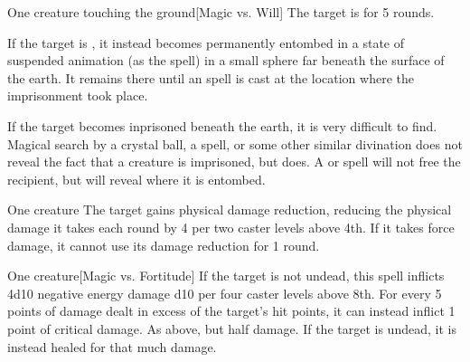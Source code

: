 \spellrng{\rngclose}
\begin{spelltarget}{One creature touching the ground}[Magic vs. Will]
    \spellsuccess The target is \slowed for 5 rounds.

    \spellsuccess If the target is \bloodied, it instead becomes permanently entombed in a state of suspended animation (as the  spell) in a small sphere far beneath the surface of the earth. It remains there until an  spell is cast at the location where the imprisonment took place.
\end{spelltarget}

\spellnotes If the target becomes inprisoned beneath the earth, it is very difficult to find. Magical search by a crystal ball, a  spell, or some other similar divination does not reveal the fact that a creature is imprisoned, but  does. A  or  spell will not free the recipient, but will reveal where it is entombed.

\spellrng{\rngclose}
\spelldur{\durshort}
\begin{spelltarget}{One creature}
    \spelleffect The target gains physical damage reduction, reducing the physical damage it takes each round by 4  per two caster levels above 4th. If it takes force damage, it cannot use its damage reduction for 1 round.
\end{spelltarget}

\spellrng{\rngclose}
\begin{spelltarget}{One creature}[Magic vs. Fortitude]
    \spellsuccess If the target is not undead, this spell inflicts 4d10 negative energy damage \add d10 per four caster levels above 8th. For every 5 points of damage dealt in excess of the target's hit points, it can instead inflict 1 point of critical damage.
    \spellfailure As above, but half damage.
    \spelleffect If the target is undead, it is instead healed for that much damage.
\end{spelltarget}

